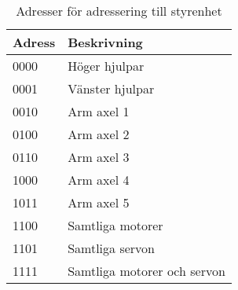 \begin{table}[h]
	\centering
		\begin{tabularx}{\textwidth}{| l | X |}
			\hline
			\textbf{Adress} & \textbf{Beskrivning} \\
			\hline
			{0000} & {Höger hjulpar} \\
			\hline
			{0001} & {Vänster hjulpar} \\
			\hline
			{0010} & {Arm axel 1} \\ %
			\hline
			{0100} & {Arm axel 2} \\
			\hline
			{0110} & {Arm axel 3} \\
			\hline
			{1000} & {Arm axel 4} \\
			\hline
			{1011} & {Arm axel 5} \\ %
			\hline
			{1100} & {Samtliga motorer} \\
			\hline
			{1101} & {Samtliga servon} \\
			\hline
			{1111} & {Samtliga motorer och servon} \\
			\hline
		\end{tabularx}
	\caption{Adresser för adressering till styrenhet} \label{protokoll:pc-motor-adress-tabell}
\end{table}
 \\